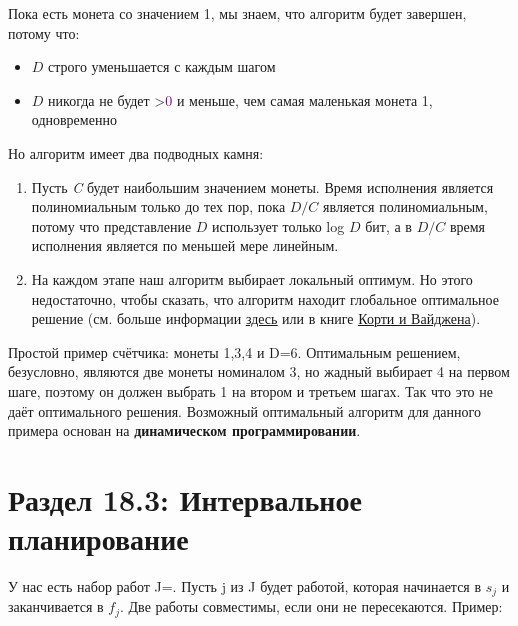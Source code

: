 Пока есть монета со значением 1, мы знаем, что алгоритм будет завершен, потому что:
\begin{itemize}
    \item $D$ строго уменьшается с каждым шагом
    \item $D$ никогда не будет >\textcolor{Purple}{0} и меньше, чем самая маленькая монета 1, одновременно
\end{itemize}

Но алгоритм имеет два подводных камня:
\begin{enumerate}
    \item Пусть \textit{C} будет наибольшим значением монеты. Время исполнения является полиномиальным только до тех пор, пока $D/C$ является полиномиальным, потому что представление $D$ использует только { log} $D$ бит, а в $D/C$ время исполнения является по меньшей мере линейным.
    \item На каждом этапе наш алгоритм выбирает локальный оптимум. Но этого недостаточно, чтобы сказать, что алгоритм находит глобальное оптимальное решение (см. больше информации \href{https://vk.cc/atBY90}{\underline{здесь}} или в книге \href{http://www.or.uni-bonn.de/~vygen/co.html}{\underline{Корти и Вайджена}}).
\end{enumerate}

\vspace{\baselineskip}

Простой пример счётчика: монеты 1,3,4 и D=6. Оптимальным решением, безусловно, являются две монеты номиналом 3, но жадный выбирает 4 на первом шаге, поэтому он должен выбрать 1 на втором и третьем шагах. Так что это не даёт оптимального решения. Возможный оптимальный алгоритм для данного примера основан на \textbf{динамическом программировании}.

\section*{Раздел 18.3: Интервальное планирование}

У нас есть набор работ J={}. Пусть { j} из J будет работой, которая начинается в { $s_j$} и заканчивается в { $f_j$}. Две работы совместимы, если они не пересекаются. Пример:

\newpage

\begin{center}
\end{center}

